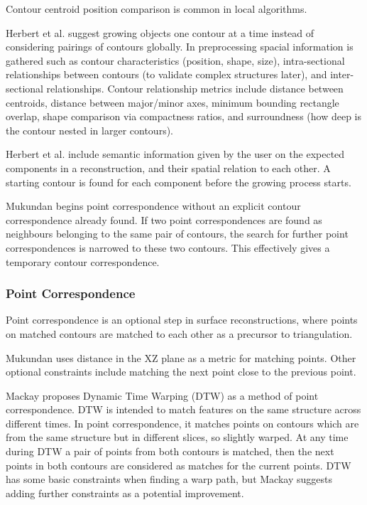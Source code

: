 \documentclass[11p, titlepage]{article}
\begin{document}
Contour centroid position comparison is common in local algorithms.

Herbert et al. \cite{herbert2001contour} suggest growing objects one contour at a time instead of considering pairings of contours globally. In preprocessing spacial information is gathered such as contour characteristics (position, shape, size), intra-sectional relationships between contours (to validate complex structures later), and inter-sectional relationships. Contour relationship metrics include distance between centroids, distance between major/minor axes, minimum bounding rectangle overlap, shape comparison via compactness ratios, and surroundness (how deep is the contour nested in larger contours).

Herbert et al. \cite{herbert2001contour} include semantic information given by the user on the expected components in a reconstruction, and their spatial relation to each other. A starting contour is found for each component before the growing process starts.

Mukundan \cite{mukundan2016reconstruction} begins point correspondence without an explicit contour correspondence already found. If two point correspondences are found as neighbours belonging to the same pair of contours, the search for further point correspondences is narrowed to these two contours. This effectively gives a temporary contour correspondence.

\subsubsection{Point Correspondence}
Point correspondence is an optional step in surface reconstructions, where points on matched contours are matched to each other as a precursor to triangulation.

Mukundan \cite{mukundan2016reconstruction} uses distance in the XZ plane as a metric for matching points. Other optional constraints include matching the next point close to the previous point.

Mackay \cite{mackay2019robust} proposes Dynamic Time Warping (DTW) as a method of point correspondence. DTW is intended to match features on the same structure across different times. In point correspondence, it matches points on contours which are from the same structure but in different slices, so slightly warped. At any time during DTW a pair of points from both contours is matched, then the next points in both contours are considered as matches for the current points. DTW has some basic constraints when finding a warp path, but Mackay suggests adding further constraints as a potential improvement.
\end{document}
